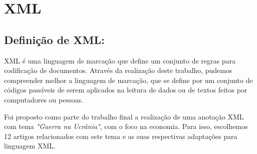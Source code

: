 \documentclass[12pt]{report}
\begin{document}
\chapter{XML} 
\section{Definição de XML:}
XML é uma linguagem de marcação que define um conjunto de regras para codificação de documentos. Através da realização deste trabalho, pudemos compreender melhor a linguagem de marcação, que se define por um conjunto de códigos passíveis de serem aplicados na leitura de dados ou de textos feitos por computadores ou pessoas. 

Foi proposto como parte do trabalho final a realização de uma anotação XML com tema \textit{"Guerra na Ucrânia"}, com o foco na economia. Para isso, escolhemos 12 artigos relacionados com este tema e as suas respectivas adaptações para linguagem XML.
\newline
\end{document}

